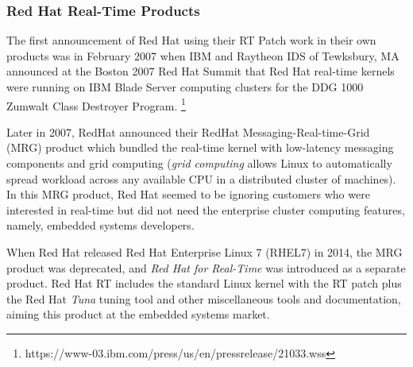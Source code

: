 \documentclass[12pt]{article}
\begin{document}
%

\subsubsection{Red Hat Real-Time Products}
The first announcement of Red Hat using their RT Patch work in their own
products was in February 2007 when IBM and Raytheon IDS of Tewksbury, MA
announced at the Boston 2007 Red Hat Summit that Red Hat real-time kernels were
running on IBM Blade Server computing clusters for the DDG 1000 Zumwalt Class
Destroyer Program.%
\footnote{https://www-03.ibm.com/press/us/en/pressrelease/21033.wss}

Later in 2007, RedHat announced their RedHat Messaging-Real-time-Grid (MRG)
product which bundled the real-time kernel with low-latency messaging components
and grid computing (\emph{grid computing} allows Linux to automatically spread
workload across any available CPU in a distributed cluster of machines).  In
this MRG product, Red Hat seemed to be ignoring customers who were interested in
real-time but did not need the enterprise cluster computing features, namely,
embedded systems developers.

When Red Hat released Red Hat Enterprise Linux 7 (RHEL7) in 2014, the MRG
product was deprecated, and \emph{Red Hat for Real-Time} was introduced as a
separate product.  Red Hat RT includes the standard Linux kernel with the RT
patch plus the Red Hat \emph{Tuna} tuning tool and other miscellaneous tools and
documentation, aiming this product at the embedded systems market.
\end{document}
